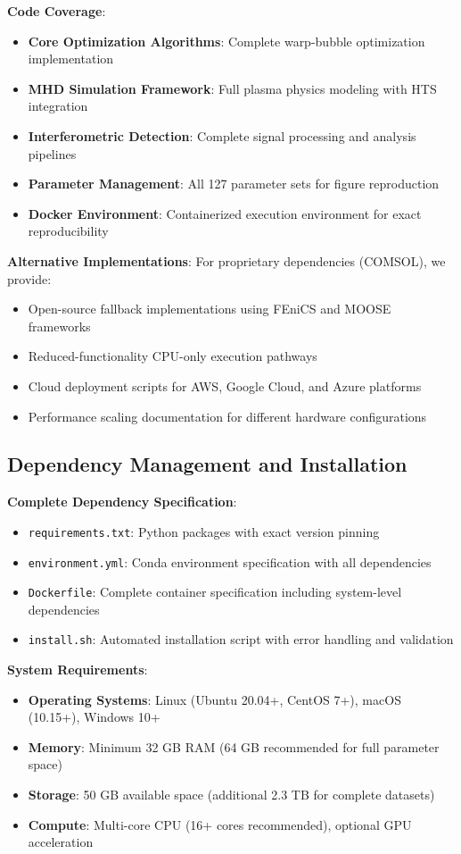 \documentclass[12pt,a4paper]{article}
\begin{document}
\textbf{Code Coverage}:
\begin{itemize}
\item \textbf{Core Optimization Algorithms}: Complete warp-bubble optimization implementation
\item \textbf{MHD Simulation Framework}: Full plasma physics modeling with HTS integration
\item \textbf{Interferometric Detection}: Complete signal processing and analysis pipelines
\item \textbf{Parameter Management}: All 127 parameter sets for figure reproduction
\item \textbf{Docker Environment}: Containerized execution environment for exact reproducibility
\end{itemize}

\textbf{Alternative Implementations}: For proprietary dependencies (COMSOL), we provide:
\begin{itemize}
\item Open-source fallback implementations using FEniCS and MOOSE frameworks
\item Reduced-functionality CPU-only execution pathways
\item Cloud deployment scripts for AWS, Google Cloud, and Azure platforms
\item Performance scaling documentation for different hardware configurations
\end{itemize}

\subsection{Dependency Management and Installation}

\textbf{Complete Dependency Specification}:
\begin{itemize}
\item \texttt{requirements.txt}: Python packages with exact version pinning
\item \texttt{environment.yml}: Conda environment specification with all dependencies
\item \texttt{Dockerfile}: Complete container specification including system-level dependencies
\item \texttt{install.sh}: Automated installation script with error handling and validation
\end{itemize}

\textbf{System Requirements}:
\begin{itemize}
\item \textbf{Operating Systems}: Linux (Ubuntu 20.04+, CentOS 7+), macOS (10.15+), Windows 10+
\item \textbf{Memory}: Minimum 32 GB RAM (64 GB recommended for full parameter space)
\item \textbf{Storage}: 50 GB available space (additional 2.3 TB for complete datasets)
\item \textbf{Compute}: Multi-core CPU (16+ cores recommended), optional GPU acceleration
\end{itemize}
\end{document}
